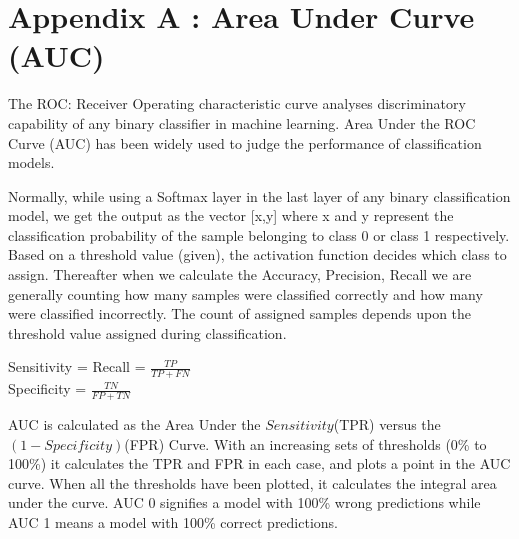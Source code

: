 \chapter{Appendix A : Area Under Curve (AUC)}\label{AUC}

The ROC: Receiver Operating characteristic curve analyses discriminatory capability of any binary classifier in machine learning. Area Under the ROC Curve (AUC) has been widely used to judge the performance of classification models. 
\vspace{3mm}

Normally, while using a Softmax layer in the last layer of any binary classification model, we get the output as the vector [x,y] where x and y represent the classification probability of the sample belonging to class 0 or class 1 respectively. Based on a threshold value (given), the activation function decides which class to assign. Thereafter when we calculate the Accuracy, Precision, Recall we are generally counting how many samples were classified correctly and how many were classified incorrectly. The count of assigned samples depends upon the threshold value assigned during classification.
\vspace{3mm}
\begin{center}
    Sensitivity = Recall = $\displaystyle\frac{TP}{TP+FN}$
    \\
Specificity = $\displaystyle\frac{TN}{FP+TN}$ \\
\end{center}

AUC is calculated as the Area Under the $Sensitivity$(TPR) versus the $(1-Specificity)$(FPR) Curve. With an increasing sets of thresholds (0\% to 100\%) it calculates the TPR and FPR in each case, and plots a point in the AUC curve. When all the thresholds have been plotted, it calculates the integral area under the curve. AUC 0 signifies a model with 100\% wrong predictions while AUC 1 means a model with 100\% correct predictions.





